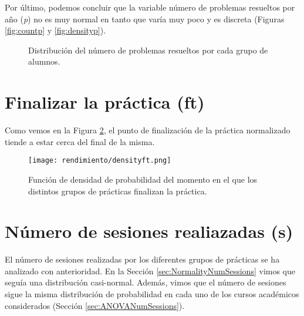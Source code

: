 Por último, podemos concluir que la variable número de problemas resueltos por año (\emph{p}) no es muy normal en tanto que varía muy poco y es discreta (Figuras \ref{fig:countp} y \ref{fig:densityp}).

\begin{figure}[H]
\centering
{}\qquad
{}
\caption{Distribución del número de problemas resueltos por cada grupo de alumnos.}
\label{fig:normalityp}
\end{figure}

\section{Finalizar la práctica (ft)}

Como vemos en la Figura \ref{fig:densityplotft}, el punto de finalización de la práctica normalizado tiende a estar cerca del final de la misma.

 \begin{figure}[H]
    \centering
    \texttt{[image: rendimiento/densityft.png]}
    \caption{Función de densidad de probabilidad del momento en el que los distintos grupos de prácticas finalizan la práctica.}
    \label{fig:densityplotft}
\end{figure}

\section{Número de sesiones realiazadas (s)}

El número de sesiones realizadas por los diferentes grupos de prácticas se ha analizado con anterioridad. En la Sección \ref{sec:NormalityNumSessions} vimos que seguía una distribución casi-normal. Además, vimos que el número de sesiones sigue la misma distribución de probabilidad en cada uno de los cursos académicos considerados (Sección \ref{sec:ANOVANumSessions}).



